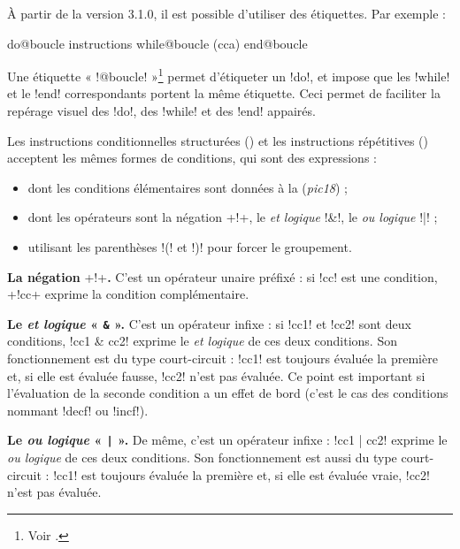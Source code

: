 À partir de la version 3.1.0, il est possible d'utiliser des étiquettes. Par exemple :
\begin{piccolo}
do@boucle
  instructions
while@boucle (cca)
end@boucle
\end{piccolo}

Une étiquette « \pic!@boucle! »\footnote{Voir .} permet d'étiqueter un \pic!do!, et impose que les \pic!while! et le \pic!end! correspondants portent la même étiquette. Ceci permet de faciliter la repérage visuel des \pic!do!, des \pic!while! et des \pic!end! appairés.





Les instructions conditionnelles structurées () et les instructions répétitives () acceptent les mêmes formes de conditions, qui sont des expressions :\begin{itemize}
  \item dont les conditions élémentaires sont données à la  (\emph{pic18}) ;
  \item dont les opérateurs sont la négation \pic+!+, le \emph{et logique} \pic!&!, le \emph{ou logique} \pic!|! ;
  \item utilisant les parenthèses \pic!(! et \pic!)! pour forcer le groupement.
\end{itemize}

\textbf{La négation }\pic+!+\textbf{.} C'est un opérateur unaire préfixé : si \pic!cc! est une condition, \pic+!cc+ exprime la condition complémentaire. %


\textbf{Le \emph{et logique} « \texttt{\&} ».} C'est un opérateur infixe : si \pic!cc1! et \pic!cc2! sont deux conditions, \pic!cc1 & cc2! exprime le \emph{et logique} de ces deux conditions. Son fonctionnement est du type court-circuit : \pic!cc1! est toujours évaluée la première et, si elle est évaluée fausse, \pic!cc2! n'est pas évaluée. Ce point est important si l'évaluation de la seconde condition a un effet de bord (c'est le cas des conditions nommant \pic!decf! ou \pic!incf!).

\textbf{Le \emph{ou logique} « \texttt{|} ».} De même, c'est un opérateur infixe : \pic!cc1 | cc2! exprime le \emph{ou logique} de ces deux conditions. Son fonctionnement est aussi du type court-circuit : \pic!cc1! est toujours évaluée la première et, si elle est évaluée vraie, \pic!cc2! n'est pas évaluée.

